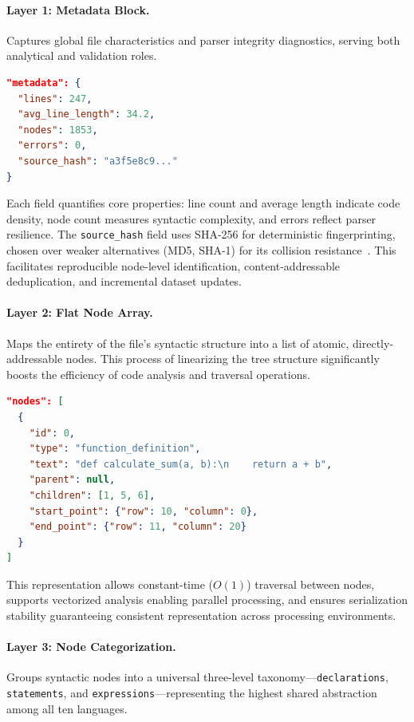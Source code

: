 \documentclass{article}
\begin{document}
\paragraph{Layer 1: Metadata Block.}  
Captures global file characteristics and parser integrity diagnostics, serving both analytical and validation roles. \\

\begin{lstlisting}[language=json,caption={Example metadata block for a parsed source file.}]
"metadata": {
  "lines": 247,
  "avg_line_length": 34.2,
  "nodes": 1853,
  "errors": 0,
  "source_hash": "a3f5e8c9..."
}
\end{lstlisting}

Each field quantifies core properties: line count and average length indicate code density, node count measures syntactic complexity, and errors reflect parser resilience. The \texttt{source\_hash} field uses SHA-256 for deterministic fingerprinting, chosen over weaker alternatives (MD5, SHA-1) for its collision resistance~\cite{nist2015, velvindronl2021}. This facilitates reproducible node-level identification, content-addressable deduplication, and incremental dataset updates.

\paragraph{Layer 2: Flat Node Array.}  
Maps the entirety of the file's syntactic structure into a list of atomic, directly-addressable nodes. This process of linearizing the tree structure significantly boosts the efficiency of code analysis and traversal operations.

\begin{lstlisting}[language=json,caption={Representative AST node structure.}]
"nodes": [
  {
    "id": 0,
    "type": "function_definition",
    "text": "def calculate_sum(a, b):\n    return a + b",
    "parent": null,
    "children": [1, 5, 6],
    "start_point": {"row": 10, "column": 0},
    "end_point": {"row": 11, "column": 20}
  }
]
\end{lstlisting}

This representation allows constant-time ($O(1)$) traversal between nodes, supports vectorized analysis enabling parallel processing, and ensures serialization stability guaranteeing consistent representation across processing environments.

\paragraph{Layer 3: Node Categorization.}  
Groups syntactic nodes into a universal three-level taxonomy—\texttt{declarations}, \texttt{statements}, and \texttt{expressions}—representing the highest shared abstraction among all ten languages.
\end{document}
